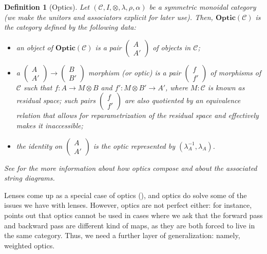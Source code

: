 \documentclass[11pt,a4paper,openright,twoside]{report}
\newcounter{mycounter}
\theoremstyle{plain}
\newtheorem{definition}[mycounter]{Definition}
\theoremstyle{definition}
\begin{document}
\begin{definition}[Optics]
  Let $(\mathcal{C}, I, \otimes, \lambda, \rho, \alpha)$ be a symmetric monoidal category (we make the unitors and associators explicit for later use). Then, $\mathbf{Optic}(\mathcal{C})$ is the category defined by the following data:
  \begin{itemize}
    \item an object of $\mathbf{Optic}(\mathcal{C})$ is a pair $\left(\begin{smallmatrix} A \\ A' \end{smallmatrix}\right)$ of objects in $\mathcal{C}$; 
    \item a $\left(\begin{smallmatrix} A \\ A' \end{smallmatrix}\right) \to \left(\begin{smallmatrix} B \\ B' \end{smallmatrix}\right)$ morphism (or optic) is a pair $\left(\begin{smallmatrix} f \\ f' \end{smallmatrix}\right)$ of morphisms of $\mathcal{C}$ such that $f: A \to M \otimes B$ and $f': M \otimes B' \to A'$, where $M : \mathcal{C}$ is known as residual space; such pairs $\left(\begin{smallmatrix} f \\ f' \end{smallmatrix}\right)$ are also quotiented by an equivalence relation that allows for reparametrization of the residual space and effectively makes it inaccessible;
    \item the identity on $\left(\begin{smallmatrix} A \\ A' \end{smallmatrix}\right)$ is the optic represented by $(\lambda_A^{-1}, \lambda_A)$.
  \end{itemize}
  See \cite{riley2018categories} for the more information about how optics compose and about the associated string diagrams.
\end{definition}

Lenses come up as a special case of optics (\cite{riley2018categories}), and optics do solve some of the issues we have with lenses. However, optics are not perfect either: for instance, \cite{gavranovic2024fundamental} points out that optics cannot be used in cases where we ask that the forward pass and backward pass are different kind of maps, as they are both forced to live in the same category. Thus, we need a further layer of generalization: namely, weighted optics.
\end{document}
